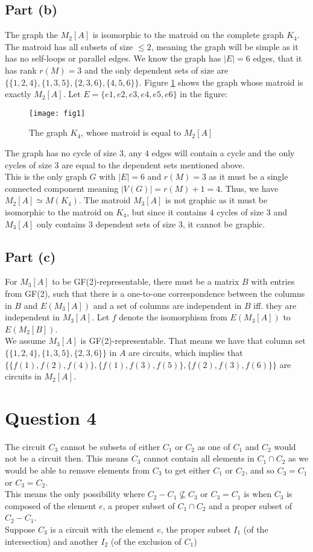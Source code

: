 \documentclass[a4paper, fleqn]{article}
\begin{document}
\subsection*{Part (b)}
The graph the $M_2[A]$ is isomorphic to the matroid on the complete graph $K_4$.
The matroid has all subsets of size $\leq 2$, meaning the graph will be simple as it has no self-loops or parallel edges. We know the graph has $|E|=6$ edges, that it has rank $r(M)=3$ and the only dependent sets of size are $\{\{1,2,4\}, \{1,3,5\},\{2,3,6\}, \{4,5,6\}\}$. Figure \ref{fig1} shows the graph whose matroid is exactly $M_2[A]$. Let $E=\{e1, e2, e3, e4, e5, e6\}$ in the figure:
\begin{figure}[H]
  \centering
  \texttt{[image: fig1]}
  \caption{The graph $K_4$, whose matroid is equal to $M_2[A]$}
  \label{fig1}
\end{figure}
The graph has no cycle of size $3$, any $4$ edges will contain a cycle and the only cycles of size $3$ are equal to the dependent sets mentioned above. \\
This is the only graph $G$ with $|E|=6$ and $r(M)=3$ as it must be a single connected component meaning $|V(G)|=r(M)+1=4$.  Thus, we have $M_2[A]\simeq M(K_4)$. The matroid $M_3[A]$ is not graphic as it must be isomorphic to the matroid on $K_4$, but since it contains $4$ cycles of size $3$ and $M_3[A]$ only contains $3$ dependent sets of size $3$, it cannot be graphic.

\subsection*{Part (c)}
For $M_3[A]$ to be GF(2)-representable, there must be a matrix $B$ with entries from GF(2), such that there is a one-to-one correspondence between the columns in $B$ and $E(M_3[A])$ and a set of columns are independent in $B$ iff. they are independent in $M_3[A]$. Let $f$ denote the isomorphism from $E(M_3[A])$ to $E(M_2[B])$.\\
We assume $M_3[A]$ is GF(2)-representable. That means we have that column set $\{\{1,2,4\}, \{1,3,5\}, \{2,3,6\}\}$ in $A$ are circuits, which implies that $\{\{f(1),f(2),f(4)\}, \{f(1),f(3),f(5)\}, \{f(2),f(3),f(6)\}\}$ are circuits in $M_2[A]$.


\section*{Question 4}
The circuit $C_3$ cannot be subsets of either $C_1$ or $C_2$ as one of $C_1$ and $C_2$ would not be a circuit then. This means $C_3$ cannot contain all elements in $C_1\cap C_2$ as we would be able to remove elements from $C_3$ to get either $C_1$ or $C_2$, and so $C_3=C_1$ or $C_3=C_2$. \\
This means the only possibility where $C_2-C_1\not\subseteq C_3$ or $C_3=C_1$ is when  $C_3$ is composed of the element $e$, a proper subset of $C_1\cap C_2$ and a proper subset of $C_2-C_1$. \\
Suppose $C_3$ is a circuit with the element $e$, the proper subset $I_1$ (of the intersection) and another $I_2$ (of the exclusion of $C_1$)
\end{document}
